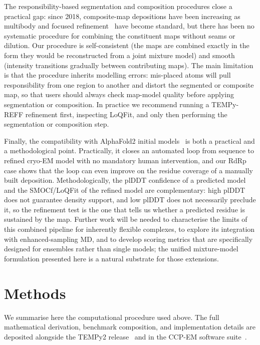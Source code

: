 \documentclass[11pt]{article}
\begin{document}
The responsibility-based segmentation and composition procedures close a practical gap: since 2018, composite-map depositions have been increasing as multibody and focused refinement~\cite{nakane2018,scheres2012} have become standard, but there has been no systematic procedure for combining the constituent maps without seams or dilution. Our procedure is self-consistent (the maps are combined exactly in the form they would be reconstructed from a joint mixture model) and smooth (intensity transitions gradually between contributing maps). The main limitation is that the procedure inherits modelling errors: mis-placed atoms will pull responsibility from one region to another and distort the segmented or composite map, so that users should always check map-model quality before applying segmentation or composition. In practice we recommend running a TEMPy-REFF refinement first, inspecting LoQFit, and only then performing the segmentation or composition step.

Finally, the compatibility with AlphaFold2 initial models~\cite{jumper2021,baek2021} is both a practical and a methodological point. Practically, it closes an automated loop from sequence to refined cryo-EM model with no mandatory human intervention, and our RdRp case shows that the loop can even improve on the residue coverage of a manually built deposition. Methodologically, the plDDT confidence of a predicted model and the SMOCf/LoQFit of the refined model are complementary: high plDDT does not guarantee density support, and low plDDT does not necessarily preclude it, so the refinement test is the one that tells us whether a predicted residue is sustained by the map. Further work will be needed to characterise the limits of this combined pipeline for inherently flexible complexes, to explore its integration with enhanced-sampling MD, and to develop scoring metrics that are specifically designed for ensembles rather than single models; the unified mixture-model formulation presented here is a natural substrate for those extensions.

\section{Methods}
We summarise here the computational procedure used above. The full mathematical derivation, benchmark composition, and implementation details are deposited alongside the TEMPy2 release~\cite{farabella2015} and in the CCP-EM software suite~\cite{burnley2017}.
\end{document}
